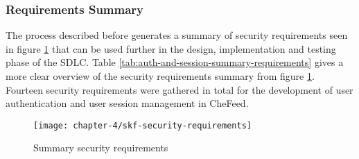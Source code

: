 \subsubsection{Requirements Summary}
The process described before generates a summary of security requirements seen in figure \ref{fig:summary-requirements} that can be used further in the design, implementation and testing phase of the SDLC. Table \ref{tab:auth-and-session-summary-requirements} gives a more clear overview of the security requirements summary from figure \ref{fig:summary-requirements}. Fourteen security requirements were gathered in total for the development of user authentication and user session management in CheFeed.

\begin{figure}
    \centering
    \texttt{[image: chapter-4/skf-security-requirements]}
    \caption{Summary security requirements}
    \label{fig:summary-requirements}
\end{figure}

